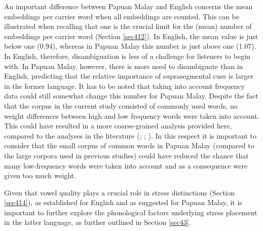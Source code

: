 An important difference between Papuan Malay and English concerns the mean embeddings per carrier word when all embeddings are counted. This can be illustrated when recalling that one is the crucial limit for the (mean) number of embeddings per carrier word (Section \ref{sec412}). In English, the mean value is just below one (0.94), whereas in Papuan Malay this number is just above one (1.07). In English, therefore, disambiguation is less of a challenge for listeners to begin with. In Papuan Malay, however, there is more need to disambiguate than in English, predicting that the relative importance of suprasegmental cues is larger in the former language. It has to be noted that taking into account frequency data could still somewhat change this number for Papuan Malay. Despite the fact that the corpus in the current study consisted of commonly used words, no weight differences between high and low frequency words were taken into account. This could have resulted in a more coarse-grained analysis provided here, compared to the analyses in the literature (\citealt{cutler_explaining_2006}; \citealt{cutler_phonemic_2004}; \citealt{mcqueen_models_1995}). In this respect it is important to consider that the small corpus of common words in Papuan Malay (compared to the large corpora used in previous studies) could have reduced the chance that many low-frequency words were taken into account and as a consequence were given too much weight.\par Given that vowel quality plays a crucial role in stress distinctions (Section \ref{sec414}), as established for English and as suggested for Papuan Malay, it is important to further explore the phonological factors underlying stress placement in the latter language, as further outlined in Section \ref{sec43}.



